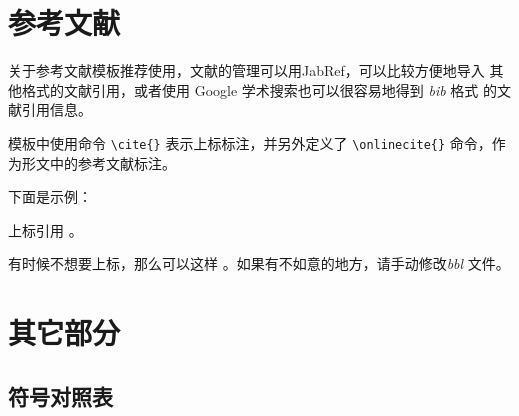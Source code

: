 
\section{参考文献}
\label{sec:bib}

关于参考文献模板推荐使用\BibTeX{}，文献的管理可以用JabRef，可以比较方便地导入
其他格式的文献引用，或者使用 Google 学术搜索也可以很容易地得到 \emph{bib} 格式
的文献引用信息。

模板中使用命令 \verb|\cite{}| 表示上标标注，并另外定义了 \verb|\onlinecite{}|
命令，作为形文中的参考文献标注。

下面是示例：

上标引用 \cite{chen2001,nadkarni1992,hua1973,zhu1973,huo1981,timoshenko1959,zhang1991,dupont1974,ding2001,cairns1965,patent,standard,wang2005}。

有时候不想要上标，那么可以这样 。如果有不如意的地方，请手动修改\emph{bbl} 文件。

\section{其它部分}
\label{sec:otherparts}

\subsection*{符号对照表}

